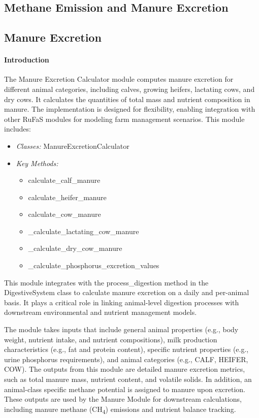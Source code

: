 \begin{refsection}
\section{Methane Emission and Manure Excretion}
\subsection{Manure Excretion}
 
    \paragraph{Introduction}
    The Manure Excretion Calculator module computes manure excretion for different animal categories, including calves, growing heifers, lactating cows, and dry cows. It calculates the quantities of total mass and nutrient composition in manure. The implementation is designed for flexibility, enabling integration with other RuFaS modules for modeling farm management scenarios.
    This module includes:
    \vspace{0.2cm}

    \begin{itemize}
        \item \textit{Classes:} ManureExcretionCalculator
        \item \textit{Key Methods:}
        \begin{itemize}
            \item calculate\_calf\_manure
            \item calculate\_heifer\_manure
            \item calculate\_cow\_manure
            \item \_calculate\_lactating\_cow\_manure
            \item \_calculate\_dry\_cow\_manure
            \item \_calculate\_phosphorus\_excretion\_values
        \end{itemize}


    \end{itemize}


    This module integrates with the process\_digestion method in the DigestiveSystem class to calculate manure excretion on a daily and per-animal basis. It plays a critical role in linking animal-level digestion processes with downstream environmental and nutrient management models.
    
    The module takes inputs that include general animal properties (e.g., body weight, nutrient intake, and nutrient compositions), milk production characteristics (e.g., fat and protein content), specific nutrient properties (e.g., urine phosphorus requirements), and animal categories (e.g., CALF, HEIFER, COW). The outputs from this module are detailed manure excretion metrics, such as total manure mass, nutrient content, and volatile solids. In addition, an animal-class specific methane potential is assigned to manure upon excretion. These outputs are used by the Manure Module for downstream calculations, including manure methane (CH\textsubscript{4}) emissions and nutrient balance tracking.



\end{refsection}
